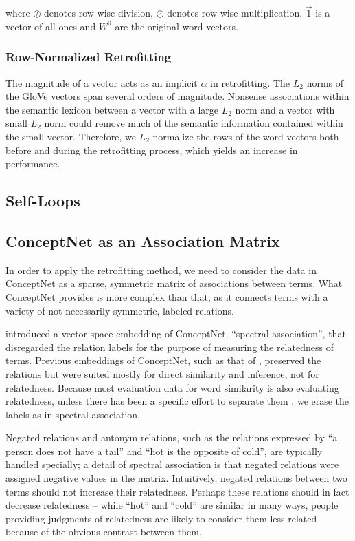 \documentclass[letterpaper]{article}
\begin{document}
where $\oslash$ denotes row-wise division, $\odot$ denotes row-wise
multiplication, $\vec{1}$ is a vector of all ones and $W^0$ are the original
word vectors.

\subsubsection{Row-Normalized Retrofitting}

The magnitude of a vector acts as an implicit $\alpha$ in retrofitting.
The $L_2$ norms of the GloVe vectors span several orders of magnitude.
Nonsense associations within the semantic lexicon between a vector with a large
$L_2$ norm and a vector with small $L_2$ norm could remove much of the semantic
information contained within the small vector. Therefore, we $L_2$-normalize
the rows of the word vectors both before and during the retrofitting process,
which yields an increase in performance.

\subsection{Self-Loops}

\subsection{ConceptNet as an Association Matrix}

In order to apply the retrofitting method, we need to consider the data in
ConceptNet as a sparse, symmetric matrix of associations between terms. What
ConceptNet provides is more complex than that, as it connects terms with a
variety of not-necessarily-symmetric, labeled relations.

 introduced a vector space embedding of ConceptNet,
``spectral association'', that disregarded the relation labels for the purpose
of measuring the relatedness of terms. Previous embeddings of ConceptNet, such
as that of , preserved the relations but were
suited mostly for direct similarity and inference, not for relatedness. Because
most evaluation data for word similarity is also evaluating relatedness, unless
there has been a specific effort to separate them \cite{agirre2009similarity},
we erase the labels as in spectral association.

Negated relations and antonym relations, such as the relations expressed by
``a person does not have a tail'' and ``hot is the opposite of cold'', are
typically handled specially; a detail of spectral association is that negated
relations were assigned negative values in the matrix. Intuitively, negated
relations between two terms should not increase their relatedness. Perhaps
these relations should in fact decrease relatedness -- while ``hot'' and
``cold'' are similar in many ways, people providing judgments of relatedness
are likely to consider them less related because of the obvious contrast
between them.
\end{document}
